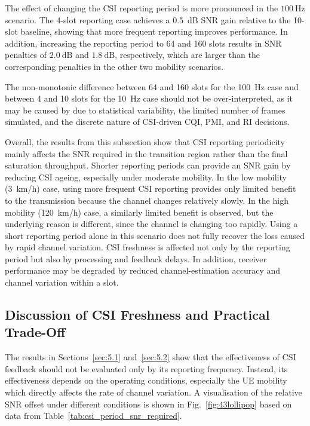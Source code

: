 \documentclass[a4paper,12pt,onecolumn]{article}
\begin{document}
			The effect of changing the CSI reporting period is more pronounced in the
			\(100~\mathrm{Hz}\) scenario. The 4-slot reporting case achieves a 0.5~dB SNR gain relative to the 10-slot baseline, showing that more frequent reporting improves performance. In addition, increasing the reporting period to 64 and 160 slots results in SNR penalties of \(2.0~\mathrm{dB}\) and \(1.8~\mathrm{dB}\), respectively, which are larger than the corresponding penalties in the other two mobility scenarios.
		
			The non-monotonic difference between 64 and 160 slots for the 100~Hz case and between 4 and 10 slots for the 10~Hz case should not be over-interpreted, as it may be caused by due to statistical variability, the limited number of frames simulated, and the discrete nature of CSI-driven CQI, PMI, and RI decisions. 
			
			Overall, the results from this subsection show that CSI reporting periodicity mainly affects the SNR required in the transition region rather than the final saturation throughput. Shorter reporting periods can provide an SNR gain by reducing CSI ageing, especially under moderate mobility. In the low mobility (3~km/h) case, using more frequent CSI reporting provides only limited benefit to the transmission because the channel changes relatively slowly. In the high mobility (120~km/h) case, a similarly limited benefit is observed, but the underlying reason is different, since the channel is changing too rapidly. Using a short reporting period alone in this scenario does not fully recover the loss caused by rapid channel variation. CSI freshness is affected not only by the reporting period but also by processing and feedback delays. In addition, receiver performance may be degraded by reduced channel-estimation accuracy and channel	variation within a slot.


	\subsection{Discussion of CSI Freshness and Practical Trade-Off}
		
		The results in Sections~\ref{sec:5.1} and~\ref{sec:5.2} show that the effectiveness of CSI feedback should not be evaluated only by its reporting frequency. Instead, its effectiveness depends on the operating conditions, especially the UE mobility which directly affects the rate of channel variation. A visualisation of the relative SNR offset under different conditions is shown in Fig.~\ref{fig:43lollipop} based on data from Table~\ref{tab:csi_period_snr_required}.
		
\end{document}
